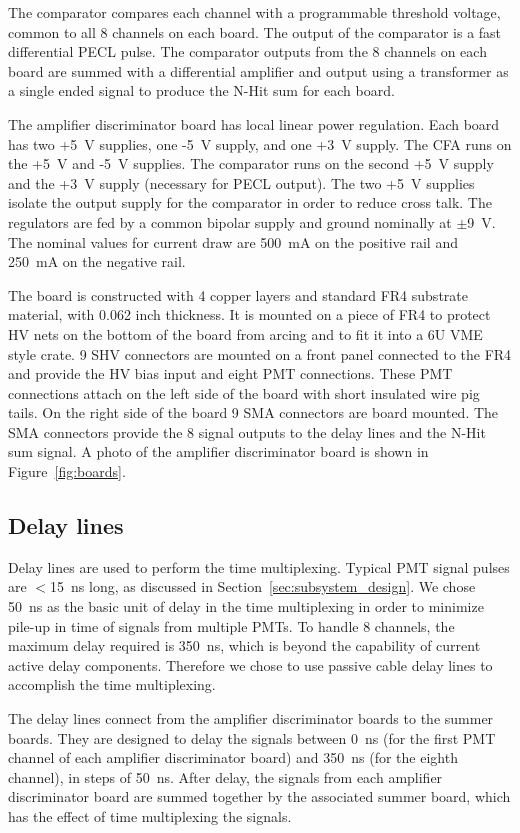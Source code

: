 \documentclass[review,number,sort&compress]{elsarticle}
\begin{document}
The comparator compares each channel with a programmable threshold
voltage, common to all 8 channels on each board. The output of the
comparator is a fast differential PECL pulse. The comparator outputs
from the 8 channels on each board are summed with a differential
amplifier and output using a transformer as a single ended signal to
produce the N-Hit sum for each board.

The amplifier discriminator board has local linear power regulation.
Each board has two +5~V supplies, one -5~V supply, and one +3~V
supply.  The CFA runs on the +5~V and -5~V supplies. The comparator
runs on the second +5~V supply and the +3~V supply (necessary for PECL
output).  The two +5~V supplies isolate the output supply for the
comparator in order to reduce cross talk. The regulators are fed by a
common bipolar supply and ground nominally at $\pm$9~V. The nominal
values for current draw are 500~mA on the positive rail and 250~mA on
the negative rail.

The board is constructed with 4 copper layers and standard FR4
substrate material, with 0.062 inch thickness. It is mounted on a piece
of FR4 to protect HV nets on the bottom of the board from arcing and
to fit it into a 6U VME style crate. 9 SHV connectors are mounted on
a front panel connected to the FR4 and provide the HV bias input and
eight PMT connections. These PMT connections attach on the left side
of the board with short insulated wire pig tails. On the right
side of the board 9 SMA connectors are board mounted. The SMA
connectors provide the 8 signal outputs to the delay lines and the
N-Hit sum signal. A photo of the amplifier discriminator
board is shown in Figure~\ref{fig:boards}.

\subsection{Delay lines}
\label{sec:Delay}
%
Delay lines are used to perform the time multiplexing.  Typical PMT
signal pulses are $<$15~ns long, as discussed in
Section~\ref{sec:subsystem_design}.  We chose 50~ns as the basic unit
of delay in the time multiplexing in order to minimize pile-up in time
of signals from multiple PMTs.  To handle 8 channels, the maximum
delay required is 350~ns, which is beyond the capability of current
active delay components.  Therefore we chose to use passive cable
delay lines to accomplish the time multiplexing.

The delay lines connect from the amplifier discriminator boards to the
summer boards. They are designed to delay the signals between 0~ns
(for the first PMT channel of each amplifier discriminator board) and
350~ns (for the eighth channel), in steps of 50~ns.  After delay, the
signals from each amplifier discriminator board are summed together by
the associated summer board, which has the effect of time multiplexing
the signals.  
\end{document}
